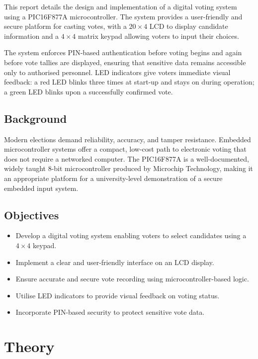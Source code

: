 \documentclass[11pt, a4paper]{report}
\begin{document}
This report details the design and implementation of a digital voting system
using a PIC16F877A microcontroller. The system provides a user-friendly and
secure platform for casting votes, with a \(20 \times 4\) LCD to display
candidate information and a \(4 \times 4\) matrix keypad allowing voters to
input their choices.

The system enforces PIN-based authentication before voting begins and again
before vote tallies are displayed, ensuring that sensitive data remains
accessible only to authorised personnel. LED indicators give voters immediate
visual feedback: a red LED blinks three times at start-up and stays on during
operation; a green LED blinks upon a successfully confirmed vote.

\section{Background}

Modern elections demand reliability, accuracy, and tamper resistance.
Embedded microcontroller systems offer a compact, low-cost path to electronic
voting that does not require a networked computer. The PIC16F877A is a
well-documented, widely taught 8-bit microcontroller produced by Microchip
Technology, making it an appropriate platform for a university-level
demonstration of a secure embedded input system.

\section{Objectives}

\begin{itemize}
    \item Develop a digital voting system enabling voters to select candidates
          using a \(4 \times 4\) keypad.
    \item Implement a clear and user-friendly interface on an LCD display.
    \item Ensure accurate and secure vote recording using
          microcontroller-based logic.
    \item Utilise LED indicators to provide visual feedback on voting status.
    \item Incorporate PIN-based security to protect sensitive vote data.
\end{itemize}

\chapter{Theory}
\end{document}
